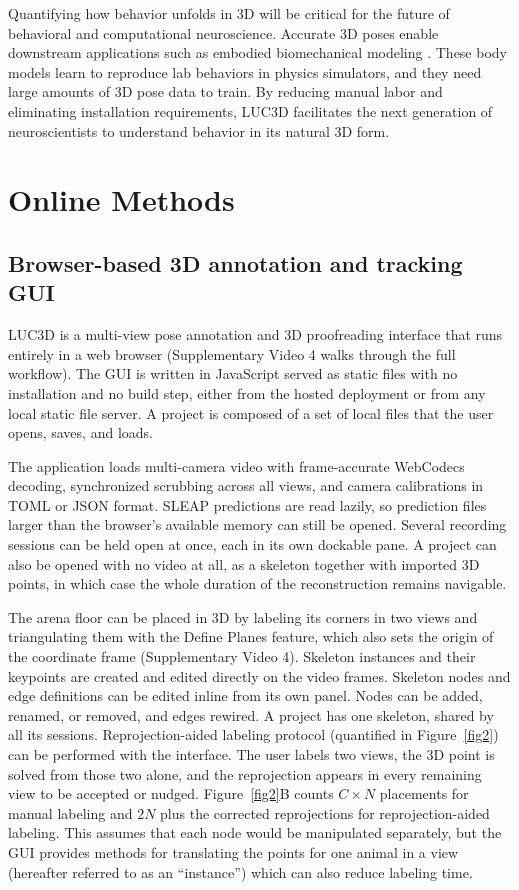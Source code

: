 \documentclass[pdflatex, sn-nature]{sn-jnl}
\theoremstyle{thmstyleone}%
\theoremstyle{thmstyletwo}%
\theoremstyle{thmstylethree}%
\begin{document}
Quantifying how behavior unfolds in 3D will be critical for the future of behavioral and computational neuroscience. Accurate 3D poses enable downstream applications such as embodied biomechanical modeling \citep{Leonardis2025,Zhang2025}. These body models learn to reproduce lab behaviors in physics simulators, and they need large amounts of 3D pose data to train. By reducing manual labor and eliminating installation requirements, LUC3D facilitates the next generation of neuroscientists to understand behavior in its natural 3D form. 

\section{Online Methods}\label{sec4}

\subsection{Browser-based 3D annotation and tracking GUI}\label{methods-app}

LUC3D is a multi-view pose annotation and 3D proofreading interface that runs entirely in a web browser (Supplementary Video 4 walks through the full workflow). The GUI is written in JavaScript served as static files with no installation and no build step, either from the hosted deployment or from any local static file server. A project is composed of a set of local files that the user opens, saves, and loads.

The application loads multi-camera video with frame-accurate WebCodecs decoding, synchronized scrubbing across all views, and camera calibrations in TOML or JSON format. SLEAP predictions are read lazily, so prediction files larger than the browser's available memory can still be opened. Several recording sessions can be held open at once, each in its own dockable pane. A project can also be opened with no video at all, as a skeleton together with imported 3D points, in which case the whole duration of the reconstruction remains navigable.

The arena floor can be placed in 3D by labeling its corners in two views and triangulating them with the Define Planes feature, which also sets the origin of the coordinate frame (Supplementary Video 4). Skeleton instances and their keypoints are created and edited directly on the video frames. Skeleton nodes and edge definitions can be edited inline from its own panel. Nodes can be added, renamed, or removed, and edges rewired. A project has one skeleton, shared by all its sessions. Reprojection-aided labeling protocol (quantified in Figure~\ref{fig2}) can be performed with the interface. The user labels two views, the 3D point is solved from those two alone, and the reprojection appears in every remaining view to be accepted or nudged. Figure~\ref{fig2}B counts $C \times N$ placements for manual labeling and $2N$ plus the corrected reprojections for reprojection-aided labeling. This assumes that each node would be manipulated separately, but the GUI provides methods for translating the points for one animal in a view (hereafter referred to as an ``instance'') which can also reduce labeling time.
\end{document}
